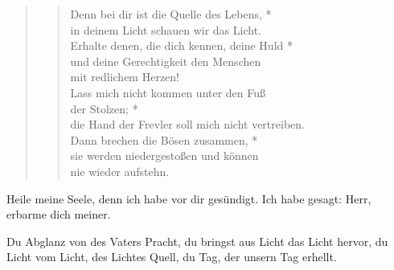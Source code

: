 \begin{quote}
\begin{verse}
Denn bei dir ist die Quelle des Lebens, *\\
in deinem Licht schauen wir das Licht.\\ 
\vin Erhalte denen, die dich kennen, deine Huld *\\ 
\vin und deine Gerechtigkeit den Menschen\\ 
\vin mit redlichem Herzen!\\
Lass mich nicht kommen unter den Fuß\\
der Stolzen; *\\
die Hand der Frevler soll mich nicht vertreiben.\\
\vin Dann brechen die Bösen zusammen, *\\ 
\vin sie werden niedergestoßen und können \\ 
\vin nie wieder aufstehn.\\ 

\end{verse}
\end{quote}

\medskip

\resp


\medskip

\begin{sloppypar}
{\noindent\rm{ Heile meine Seele, denn ich habe vor dir gesündigt. Ich habe gesagt: Herr, erbarme dich meiner.}}
\end{sloppypar}

\newpage


\def\greinitialformat#1{{\fontsize{40}{40}\selectfont #1}}
\gresetfirstlineaboveinitial{\small \textcolor{red}{hieme}}{}
\setaboveinitialseparation{0.72mm}


\medskip

\begin{sloppypar}
{\noindent\rm{ Du Abglanz von des Vaters Pracht,
du bringst aus Licht das Licht hervor,
du Licht vom Licht, des Lichtes Quell, du Tag, der unsern Tag erhellt.}}
\end{sloppypar}

\medskip

